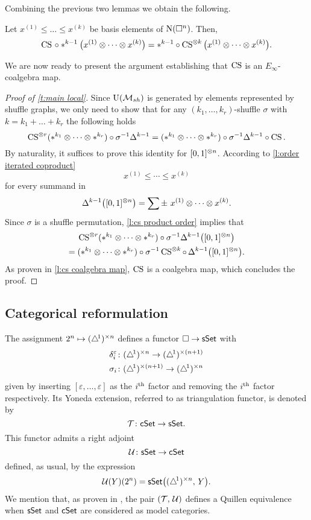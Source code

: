 Combining the previous two lemmas we obtain the following.

\begin{lemma} \label{l:cs product order}
	Let $x^{(1)} \leq \dots \leq x^{(k)}$ be basis elements of $\operatorname{N}(\square^n)$.
	Then,
	\[
	\operatorname{CS} \, \circ \ast^{k-1} \big( x^{(1)} \otimes \dotsb \otimes x^{(k)} \big)
	=
	\ast^{k-1} \circ \operatorname{CS}^{\otimes k} \big( x^{(1)} \otimes \dotsb \otimes x^{(k)} \big).
	\]
\end{lemma}

We are now ready to present the argument establishing that $\operatorname{CS}$ is an $E_\infty$-coalgebra map.

\begin{proof}[Proof of \cref{t:main local}]
	Since ${\operatorname{U}(\mathcal{M}_{sh})}$ is generated by elements represented by shuffle graphs, we only need to show that for any $(k_1,\dots,k_r)$-shuffle $\sigma$ with $k = k_1+\dots+k_r$ the following holds
	\[
	\operatorname{CS}^{\otimes r}(\ast^{k_1} \otimes \dotsb \otimes \ast^{k_r}) \circ \sigma^{-1} \Delta^{k-1} =
	(\ast^{k_1} \otimes \dotsb \otimes \ast^{k_r}) \circ \sigma^{-1} \Delta^{k-1} \circ \operatorname{CS}.
	\]
	By naturality, it suffices to prove this identity for $[0,1]^{\otimes n}$.
	According to \cref{l:order iterated coproduct}
	\[
	x^{(1)} \leq \cdots \leq x^{(k)}
	\]
	for every summand in
	\[
	\Delta^{k-1} \big([0,1]^{\otimes n}\big) =
	\sum \pm \ x^{(1)} \otimes \cdots \otimes x^{(k)}.
	\]
	Since $\sigma$ is a shuffle permutation, \cref{l:cs product order} implies that
	\begin{multline*}
		\operatorname{CS}^{\otimes r}(\ast^{k_1} \otimes \dotsb \otimes \ast^{k_r}) \circ \sigma^{-1} \Delta^{k-1} \big([0,1]^{\otimes n}\big) \\ =
		(\ast^{k_1} \otimes \dotsb \otimes \ast^{k_r}) \circ \sigma^{-1} \operatorname{CS}^{\otimes k} \circ \, \Delta^{k-1} \big([0,1]^{\otimes n}\big).
	\end{multline*}
	As proven in \cref{l:cs coalgebra map}, $\operatorname{CS}$ is a coalgebra map, which concludes the proof.
\end{proof}

\subsection{Categorical reformulation} \label{ss:e infty preservation}

The assignment $2^n \mapsto (\triangle^{\!1})^{\times n}$ defines a functor $\square \to \mathsf{sSet}$ with
\begin{align*}
	&\delta_i^\varepsilon \colon (\triangle^{\!1})^{\times n} \to (\triangle^{\!1})^{\times (n+1)} \\
	&\sigma_i \colon (\triangle^{\!1})^{\times (n+1)} \to (\triangle^{\!1})^{\times n}
\end{align*}
given by inserting $[\varepsilon, \dots, \varepsilon]$ as the $i^{\mathrm{th}}$ factor and removing the $i^{\mathrm{th}}$ factor respectively.
Its Yoneda extension, referred to as triangulation functor, is denoted by
\[
\operatorname{\mathcal{T}} \colon \mathsf{cSet} \to \mathsf{sSet}.
\]
This functor admits a right adjoint
\[
\operatorname{\mathcal{U}} \colon \mathsf{sSet} \to \mathsf{cSet}
\]
defined, as usual, by the expression
\[
\operatorname{\mathcal{U}}(Y)(2^n) = \mathsf{sSet} \big( (\triangle^{\!1})^{\times n}, \, Y \big).
\]
We mention that, as proven in \cite[\S~8.4.30]{cisinski2006presheaves}, the pair $(\operatorname{\mathcal{T}},\, \operatorname{\mathcal{U}})$ defines a Quillen equivalence when $\mathsf{sSet}$ and $\mathsf{cSet}$ are considered as model categories.

